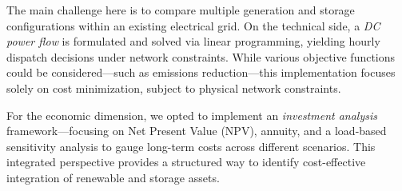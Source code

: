 The main challenge here is to compare multiple generation and storage configurations within an existing electrical grid. 
On the technical side, a \emph{DC power flow} is formulated and solved via linear programming, yielding hourly dispatch 
decisions under network constraints. While various objective functions could be considered—such as emissions reduction—this 
implementation focuses solely on cost minimization, subject to physical network constraints.

For the economic dimension, we opted to implement an \emph{investment analysis} framework—focusing on Net Present 
Value (NPV), annuity, and a load-based sensitivity analysis to gauge long-term costs across different scenarios. This 
integrated perspective provides a structured way to identify cost-effective integration of renewable and storage assets.

\newpage 
